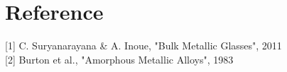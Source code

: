 \chapter{Reference}

{
\large
[1] C. Suryanarayana \& A. Inoue, "Bulk Metallic Glasses", 2011
\\

[2] Burton et al., "Amorphous Metallic Alloys", 1983
\\
}
